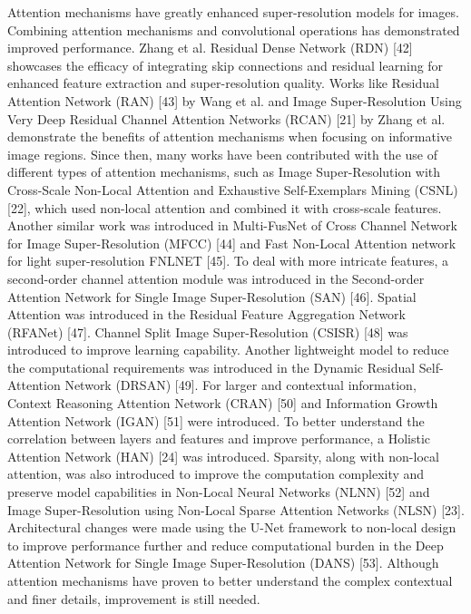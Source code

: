 \documentclass[twocolumn]{svjour3}          %
\begin{document}
Attention mechanisms have greatly enhanced super-resolution models for images. Combining attention mechanisms and convolutional operations has demonstrated improved performance. Zhang et al. Residual Dense Network (RDN) [42] showcases the efficacy of integrating skip connections and residual learning for enhanced feature extraction and super-resolution quality. Works like Residual Attention Network (RAN) [43] by Wang et al. and Image Super-Resolution Using Very Deep Residual Channel Attention Networks (RCAN) [21] by Zhang et al. demonstrate the benefits of attention mechanisms when focusing on informative image regions. Since then, many works have been contributed with the use of different types of attention mechanisms, such as Image Super-Resolution with Cross-Scale Non-Local Attention and Exhaustive Self-Exemplars Mining (CSNL) [22], which used non-local attention and combined it with cross-scale features. Another similar work was introduced in Multi-FusNet of Cross Channel Network for Image Super-Resolution (MFCC) [44] and Fast Non-Local Attention network for light super-resolution FNLNET [45]. To deal with more intricate features, a second-order channel attention module was introduced in the Second-order Attention Network for Single Image Super-Resolution (SAN) [46]. Spatial Attention was introduced in the Residual Feature Aggregation Network (RFANet) [47]. Channel Split Image Super-Resolution (CSISR) [48] was introduced to improve learning capability. Another lightweight model to reduce the computational requirements was introduced in the Dynamic Residual Self-Attention Network (DRSAN) [49]. For larger and contextual information, Context Reasoning Attention Network (CRAN) [50] and Information Growth Attention Network (IGAN) [51] were introduced. To better understand the correlation between layers and features and improve performance, a Holistic Attention Network (HAN) [24] was introduced. Sparsity, along with non-local attention, was also introduced to improve the computation complexity and preserve model capabilities in Non-Local Neural Networks (NLNN) [52] and Image Super-Resolution using Non-Local Sparse Attention Networks (NLSN) [23]. Architectural changes were made using the U-Net framework to non-local design to improve performance further and reduce computational burden in the Deep Attention Network for Single Image Super-Resolution (DANS) [53]. Although attention mechanisms have proven to better understand the complex contextual and finer details, improvement is still needed.
\end{document}
